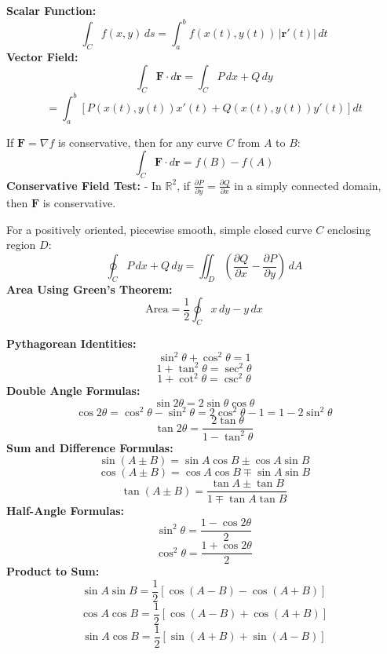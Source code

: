 \documentclass[2pt]{article}
\begin{document}
\begin{multicols}{2}
\begin{tcolorbox}[title=\textbf{Line Integrals}, colframe=lightyellow]
    \textbf{Scalar Function:}
    \[ \int_C f(x, y) \, ds = \int_a^b f(x(t), y(t)) \, |\mathbf{r}'(t)| \, dt \]
    \textbf{Vector Field:}
    \[ \int_C \mathbf{F} \cdot d\mathbf{r} = \int_C P \, dx + Q \, dy \]
    \[ = \int_a^b \left[ P(x(t), y(t)) x'(t) + Q(x(t), y(t)) y'(t) \right] dt \]
\end{tcolorbox}

\begin{tcolorbox}[title=\textbf{Fundamental Theorem for Line Integrals}, colframe=lightblue]
    If \( \mathbf{F} = \nabla f \) is conservative, then for any curve \( C \) from \( A \) to \( B \):
    \[ \int_C \mathbf{F} \cdot d\mathbf{r} = f(B) - f(A) \]
    \textbf{Conservative Field Test:}
    - In \( \mathbb{R}^2 \), if \( \frac{\partial P}{\partial y} = \frac{\partial Q}{\partial x} \) in a simply connected domain, then \( \mathbf{F} \) is conservative.
\end{tcolorbox}

\begin{tcolorbox}[title=\textbf{Green's Theorem}, colframe=lightgreen]
    For a positively oriented, piecewise smooth, simple closed curve \( C \) enclosing region \( D \):
    \[ \oint_C P \, dx + Q \, dy = \iint_D \left( \frac{\partial Q}{\partial x} - \frac{\partial P}{\partial y} \right) \, dA \]
    \textbf{Area Using Green's Theorem:}
    \[ \text{Area} = \frac{1}{2} \oint_C x \, dy - y \, dx \]
\end{tcolorbox}

\begin{tcolorbox}[title=\textbf{Trigonometric Identities}, colframe=lightpink]
    \textbf{Pythagorean Identities:}
    \[ \sin^2 \theta + \cos^2 \theta = 1 \]
    \[ 1 + \tan^2 \theta = \sec^2 \theta \]
    \[ 1 + \cot^2 \theta = \csc^2 \theta \]
    \textbf{Double Angle Formulas:}
    \[ \sin 2\theta = 2 \sin \theta \cos \theta \]
    \[ \cos 2\theta = \cos^2 \theta - \sin^2 \theta = 2 \cos^2 \theta - 1 = 1 - 2 \sin^2 \theta \]
    \[ \tan 2\theta = \frac{2 \tan \theta}{1 - \tan^2 \theta} \]
    \textbf{Sum and Difference Formulas:}
    \[ \sin (A \pm B) = \sin A \cos B \pm \cos A \sin B \]
    \[ \cos (A \pm B) = \cos A \cos B \mp \sin A \sin B \]
    \[ \tan (A \pm B) = \frac{\tan A \pm \tan B}{1 \mp \tan A \tan B} \]
    \textbf{Half-Angle Formulas:}
    \[ \sin^2 \theta = \frac{1 - \cos 2\theta}{2} \]
    \[ \cos^2 \theta = \frac{1 + \cos 2\theta}{2} \]
    \textbf{Product to Sum:}
    \[ \sin A \sin B = \frac{1}{2} [ \cos(A - B) - \cos(A + B) ] \]
    \[ \cos A \cos B = \frac{1}{2} [ \cos(A - B) + \cos(A + B) ] \]
    \[ \sin A \cos B = \frac{1}{2} [ \sin(A + B) + \sin(A - B) ] \]
\end{tcolorbox}


\end{multicols}
\end{document}

